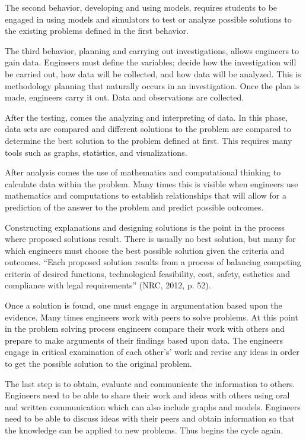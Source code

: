 \documentclass[11.5pt]{sig-alternate} %
\begin{document}
\begin{large}
The second behavior, developing and using models, requires students to be engaged in using models and simulators to test or analyze possible solutions to the existing problems defined in the first behavior.

The third behavior, planning and carrying out investigations, allows engineers to gain data. Engineers must define the variables; decide how the investigation will be carried out, how data will be collected, and how data will be analyzed. This is methodology planning that naturally occurs in an investigation.  Once the plan is made, engineers carry it out. Data and observations are collected.  

After the testing, comes the analyzing and interpreting of data. In this phase, data sets are compared and different solutions to the problem are compared to determine the best solution to the problem defined at first. This requires many tools such as graphs, statistics, and visualizations.

After analysis comes the use of mathematics and computational thinking to calculate data within the problem. Many times this is visible when engineers use mathematics and computations to establish relationships that will allow for a prediction of the answer to the problem and predict possible outcomes.  

Constructing explanations and designing solutions is the point in the process where proposed solutions result. There is usually no best solution, but many for which engineers must choose the best possible solution given the criteria and outcomes. “Each proposed solution results from a process of balancing competing criteria of desired functions, technological feasibility, cost, safety, esthetics and compliance with legal requirements” (NRC, 2012, p. 52).

Once a solution is found, one must engage in argumentation based upon the evidence. Many times engineers work with peers to solve problems. At this point in the problem solving process engineers compare their work with others and prepare to make arguments of their findings based upon data. The engineers engage in critical examination of each other’s’ work and revise any ideas in order to get the possible solution to the original problem.  

The last step is to obtain, evaluate and communicate the information to others. Engineers need to be able to share their work and ideas with others using oral and written communication which can also include graphs and models. Engineers need to be able to discuss ideas with their peers and obtain information so that the knowledge can be applied to new problems. Thus begins the cycle again. 


\end{large}
\end{document}
